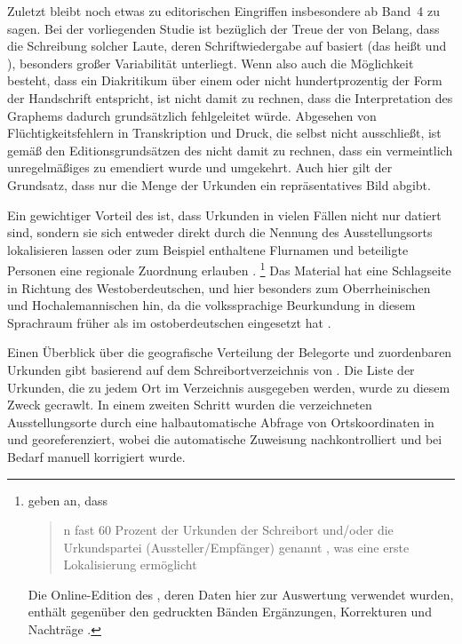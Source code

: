 Zuletzt bleibt noch etwas zu editorischen Eingriffen
insbesondere ab Band~4\nocite{cao4} zu sagen. Bei der vorliegenden Studie ist
bezüglich der Treue der  von Belang, dass die Schreibung
solcher Laute, deren Schriftwiedergabe auf  basiert (das heißt  und ), besonders großer Variabilität unterliegt.
Wenn also auch die Möglichkeit besteht, dass ein Diakritikum über einem 
oder  nicht hundertprozentig der Form der Handschrift entspricht, ist
nicht damit zu rechnen, dass die Interpretation des Graphems dadurch
grundsätzlich fehlgeleitet würde. Abgesehen von %
Flüchtigkeitsfehlern in Transkription und Druck, die selbst \citet[\RN{60},
\RN{78}]{wilhelm1932} nicht ausschließt, ist gemäß den
Editionsgrundsätzen des \CAO{} nicht damit zu rechnen,
dass ein vermeintlich unregelmäßiges  zu  emendiert wurde und
umgekehrt. Auch hier gilt der Grundsatz, dass nur die Menge der Urkunden ein
repräsentatives Bild abgibt.

Ein gewichtiger Vorteil des \CAO{} ist, dass Urkunden in vielen
Fällen nicht nur datiert sind, sondern sie sich entweder direkt durch die
Nennung des Ausstellungsorts lokalisieren lassen oder zum Beispiel enthaltene
Flurnamen und beteiligte Personen eine regionale Zuordnung erlauben
\autocite[16]{schulze2011}.%
%
	\footnote{\citet[393]{gniffkerapp2005} geben an, dass
	\blockquote{n fast 60 Prozent der Urkunden
	\textelp{} der Schreibort und/oder die Urkundspartei (Aussteller/Empfänger)
	genannt , was eine erste Lokalisierung ermöglicht}. Die
	Online-Edition des \CAO{} \autocite{cao-online}, deren Daten hier zur
	Auswertung verwendet wurden, enthält gegenüber den gedruckten Bänden
	Ergänzungen, Korrekturen und Nachträge
	\autocite[vgl.][393--394]{gniffkerapp2005}.}
%
Das Material hat eine Schlagseite in Richtung des
Westoberdeutschen, und hier besonders zum
Oberrheinischen und Hochalemannischen hin, da
die volkssprachige Beurkundung in diesem
Sprachraum früher als im ostoberdeutschen
eingesetzt hat \autocites[1774]{skala1985}[15]{schulze2011}.

Einen Überblick über die geografische Verteilung
der Belegorte und zuordenbaren Urkunden gibt
 basierend auf dem Schreibortverzeichnis von
\autocites{cao-online}[vgl.~auch][]{wmuovz}. Die Liste der Urkunden, die zu
jedem Ort im Verzeichnis ausgegeben werden, wurde zu diesem Zweck gecrawlt. In
einem zweiten Schritt wurden die verzeichneten Ausstellungsorte durch eine
halbautomatische Abfrage von Ortskoordinaten in \citet{googlemaps} und
\citet{wikipedia} georeferenziert, wobei die automatische Zuweisung
nachkontrolliert und bei Bedarf manuell korrigiert wurde.

